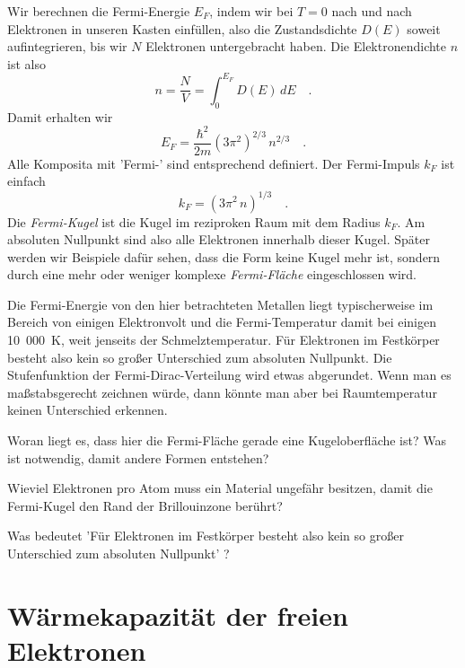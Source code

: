 Wir berechnen die Fermi-Energie $E_F$, indem wir bei $T=0$ nach und nach Elektronen in unseren Kasten einfüllen, also 
die Zustandsdichte $D(E)$ soweit aufintegrieren, bis wir $N$ Elektronen untergebracht haben. Die Elektronendichte $n$ ist also
\begin{equation}
    n = \frac{N}{V} = \int_0^{E_F} D(E) \, dE \quad .
\end{equation}
Damit erhalten wir
\begin{equation}
    E_F = \frac{\hbar^2}{2m} (3 \pi^2)^{2/3} \, n^{2/3} \quad .
\end{equation}
Alle Komposita mit 'Fermi-' sind entsprechend definiert. Der Fermi-Impuls $k_F$ ist einfach
\begin{equation}
    k_F = (3 \pi^2 \, n)^{1/3} \quad .
\end{equation}
Die \emph{Fermi-Kugel} ist die Kugel im reziproken Raum mit dem Radius $k_F$. Am absoluten Nullpunkt sind also alle Elektronen innerhalb dieser Kugel. Später werden wir Beispiele dafür sehen, dass die Form keine Kugel mehr ist, sondern durch eine mehr oder weniger komplexe \emph{Fermi-Fläche} eingeschlossen wird.


Die Fermi-Energie von den hier betrachteten Metallen liegt typischerweise im Bereich von einigen Elektronvolt und die Fermi-Temperatur damit bei einigen 10~000~K, weit jenseits der Schmelztemperatur. Für Elektronen im Festkörper besteht also kein so großer Unterschied zum absoluten Nullpunkt. Die Stufenfunktion der Fermi-Dirac-Verteilung wird etwas abgerundet. Wenn man es maßstabsgerecht zeichnen würde, dann könnte man aber bei Raumtemperatur keinen Unterschied erkennen.


\begin{questions} 
\item Woran liegt es, dass hier die Fermi-Fläche gerade eine Kugeloberfläche ist? Was ist notwendig, damit andere Formen  entstehen?
\item Wieviel Elektronen pro Atom muss ein Material ungefähr besitzen, damit die Fermi-Kugel den Rand der Brillouinzone berührt?
\item Was bedeutet 'Für Elektronen im Festkörper besteht also kein so großer Unterschied zum absoluten Nullpunkt' ?
\end{questions}



\section*{Wärmekapazität der freien Elektronen}

